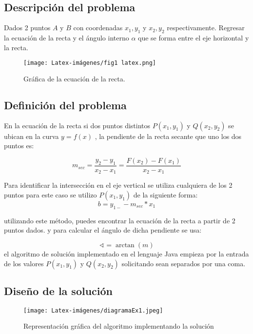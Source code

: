 
\subsection{Descripción del problema}
Dados 2 puntos $A \mbox{ y } B$ con coordenadas $x_{1}, y_{1}$ y $x_{2}, y_{2}$  respectivamente. Regresar la ecuación de la recta y el ángulo interno $\alpha$ que se forma entre el eje horizontal y la recta. 

\begin {figure}[h!]
\centerline{\texttt{[image: Latex-imágenes/fig1 latex.png]}}
\caption{Gráfica de la ecuación de la recta.}
\label{fig}
\end {figure}


\subsection{Definición del problema}
En la ecuación de la recta si dos puntos distintos $P(x_{1},y_{1})$ y $Q(x_{2},y_{2})$ se ubican en la curva $y=f(x)$ , la pendiente de la recta secante que uno los dos puntos es:

\begin{equation}
m_{sec} = \frac{y_{2} - y_{1}} {x_{2}- x_{1}} = \frac{F({x_{2}}) - {F({x_{1}})}} {x_{2}-x_{1}}
\end{equation}

Para identificar la intersección en el eje vertical se utiliza cualquiera de los 2 puntos para este caso se utilizo $P(x_{1},y_{1})$ de la siguiente forma:
\begin{equation}
    b = y_{1-} - m_{sec} * x_{1} 
\end{equation}

utilizando este método, puedes encontrar la ecuación de la recta a partir de 2 puntos dados.
y para calcular el ángulo de dicha pendiente se usa:

\begin{equation}
    \sphericalangle=\arctan(m)
\end{equation}
el algoritmo de solución implementado en el lenguaje Java empieza por la entrada de los valores $P(x_{1},y_{1})$ y $Q(x_{2},y_{2})$ solicitando sean separados por una coma.

\subsection{Diseño de la solución}
\begin {figure}[htb]
\centerline{\texttt{[image: Latex-imágenes/diagramaEx1.jpeg]}}
\caption{Representación gráfica del algoritmo implementando la solución}
\label{fig}
\end {figure}

